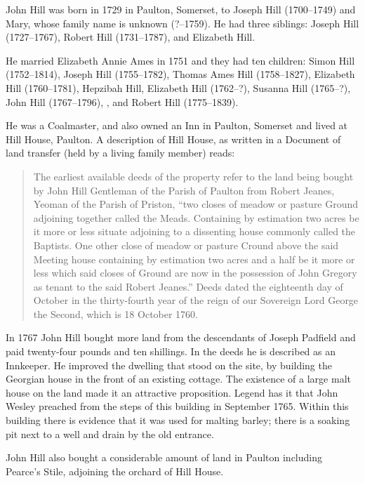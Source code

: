 
John Hill was born in 1729 in Paulton, Somerset, to Joseph Hill (1700--1749) and Mary, whose family name is unknown (?--1759). He had three siblings: Joseph Hill (1727--1767), Robert Hill (1731--1787), and Elizabeth Hill.

He married Elizabeth Annie Ames in 1751 and they had ten children: Simon Hill (1752--1814), Joseph Hill (1755--1782),
Thomas Ames Hill (1758--1827), Elizabeth Hill (1760--1781), Hepzibah Hill, Elizabeth Hill (1762--?), Susanna Hill (1765--?), John Hill (1767--1796), , and Robert Hill (1775--1839).

He was a Coalmaster, and also owned an Inn in Paulton, Somerset and lived at Hill House, Paulton. A description of  Hill House, as written in a Document of land transfer (held by a living family member) reads:\cite{TheHistoryOfHillHouse}

\begin{quotation}
The earliest available deeds of the property refer to the land being bought by John Hill Gentleman of the Parish of Paulton from Robert Jeanes, Yeoman of the Parish of Priston, ``two closes of meadow or pasture Ground adjoining together called the Meads. Containing by estimation two acres be it more or less situate adjoining to a dissenting house commonly called the Baptists. One other close of meadow or pasture Cround above the said Meeting house containing by estimation two acres and a half be it more or less which said closes of Ground are now in the possession of John Gregory as tenant to the said Robert Jeanes.'' Deeds dated the eighteenth day of October in the thirty-fourth year of the reign of our Sovereign Lord George the Second, which is 18 October 1760.
\end{quotation}

In 1767 John Hill bought more land from the descendants of Joseph Padfield and paid twenty-four pounds and ten shillings. In the deeds he is described as an Innkeeper. He improved the dwelling that stood on the site, by building the Georgian house in the front of an existing cottage. The existence of a large malt house on the land made it an attractive proposition. Legend has it that John Wesley preached from the steps of this building in September 1765. Within this building there is evidence that it was used for malting barley; there is a soaking pit next to a well and drain by the old entrance.

John Hill also bought a considerable amount of land in Paulton including Pearce's Stile, adjoining the orchard of Hill House.

